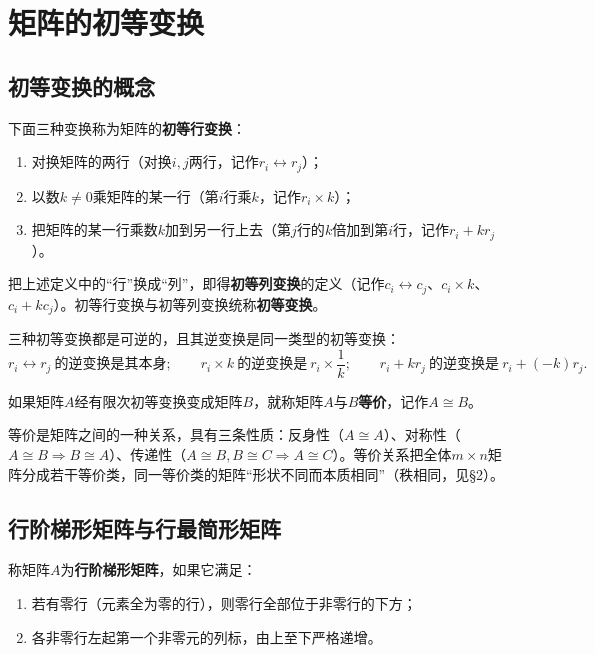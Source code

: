 ﻿\section{矩阵的初等变换}

\subsection{初等变换的概念}

\begin{definition}
下面三种变换称为矩阵的\textbf{初等行变换}：
\begin{enumerate}
\item 对换矩阵的两行（对换$i,j$两行，记作$r_i\leftrightarrow r_j$）；
\item 以数$k\neq0$乘矩阵的某一行（第$i$行乘$k$，记作$r_i\times k$）；
\item 把矩阵的某一行乘数$k$加到另一行上去（第$j$行的$k$倍加到第$i$行，记作$r_i+kr_j$）。
\end{enumerate}
把上述定义中的“行”换成“列”，即得\textbf{初等列变换}的定义（记作$c_i\leftrightarrow c_j$、$c_i\times k$、$c_i+kc_j$）。初等行变换与初等列变换统称\textbf{初等变换}。
\end{definition}

三种初等变换都是可逆的，且其逆变换是同一类型的初等变换：
\[
r_i\leftrightarrow r_j\ \text{的逆变换是其本身};\qquad
r_i\times k\ \text{的逆变换是}\ r_i\times\frac{1}{k};\qquad
r_i+kr_j\ \text{的逆变换是}\ r_i+(-k)r_j.
\]

\begin{definition}
如果矩阵$A$经有限次初等变换变成矩阵$B$，就称矩阵$A$与$B$\textbf{等价}，记作$A\cong B$。
\end{definition}

等价是矩阵之间的一种关系，具有三条性质：反身性（$A\cong A$）、对称性（$A\cong B\Rightarrow B\cong A$）、传递性（$A\cong B,B\cong C\Rightarrow A\cong C$）。等价关系把全体$m\times n$矩阵分成若干等价类，同一等价类的矩阵“形状不同而本质相同”（秩相同，见§2）。

\subsection{行阶梯形矩阵与行最简形矩阵}

\begin{definition}
称矩阵$A$为\textbf{行阶梯形矩阵}，如果它满足：
\begin{enumerate}
\item 若有零行（元素全为零的行），则零行全部位于非零行的下方；
\item 各非零行左起第一个非零元的列标，由上至下严格递增。
\end{enumerate}
\end{definition}

